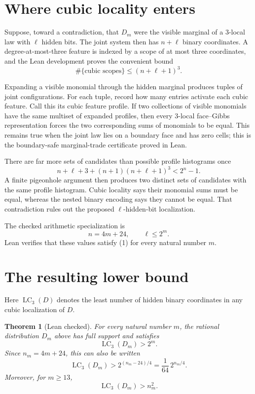 \documentclass[11pt]{article}
\newcommand{\LC}{\operatorname{LC}}
\newtheorem{theorem}{Theorem}
\begin{document}
\section{Where cubic locality enters}

Suppose, toward a contradiction, that $D_m$ were the visible marginal of a
3-local law with $\ell$ hidden bits.  The joint system then has $n+\ell$
binary coordinates.  A degree-at-most-three feature is indexed by a scope of
at most three coordinates, and the Lean development proves the convenient
bound
\[
  \#\{\text{cubic scopes}\}\le (n+\ell+1)^3.
\]

Expanding a visible monomial through the hidden marginal produces tuples of
joint configurations.  For each tuple, record how many entries activate each
cubic feature.  Call this its cubic feature profile.  If two collections of
visible monomials have the same multiset of expanded profiles, then every
3-local face--Gibbs representation forces the two corresponding sums of
monomials to be equal.  This remains true when the joint law lies on a
boundary face and has zero cells; this is the boundary-safe marginal-trade
certificate proved in Lean.

There are far more sets of candidates than possible profile histograms once
\[
  n+\ell+3+(n+1)(n+\ell+1)^3 < 2^n-1.       \tag{1}
\]
A finite pigeonhole argument then produces two distinct sets of candidates
with the same profile histogram.  Cubic locality says their monomial sums
must be equal, whereas the nested binary encoding says they cannot be equal.
That contradiction rules out the proposed $\ell$-hidden-bit localization.

The checked arithmetic specialization is
\[
  n=4m+24,
  \qquad
  \ell\le 2^m.
\]
Lean verifies that these values satisfy (1) for every natural number $m$.

\section{The resulting lower bound}

Here $\LC_3(D)$ denotes the least number of hidden binary coordinates in any
cubic localization of $D$.

\begin{theorem}[Lean checked]
For every natural number $m$, the rational distribution $D_m$ above has full
support and satisfies
\[
  \LC_3(D_m)>2^m.
\]
Since $n_m=4m+24$, this can also be written
\[
  \LC_3(D_m)>2^{(n_m-24)/4}=\frac{1}{64}\,2^{n_m/4}.
\]
Moreover, for $m\ge 13$,
\[
  \LC_3(D_m)>n_m^2.
\]
\end{theorem}
\end{document}
